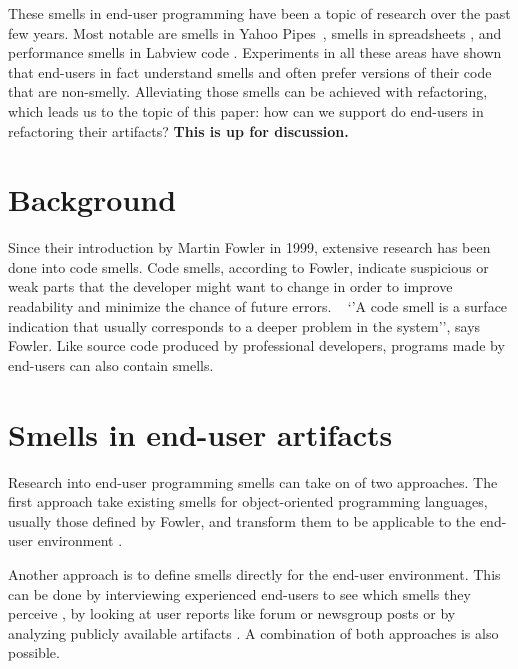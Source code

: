 \documentclass[10pt,conference,compsocconf]{IEEEtran}
\newcommand{\todo}[1]{\textbf{#1}}
\begin{document}
These smells in end-user programming have been a topic of research over the past few years. Most notable are smells in Yahoo Pipes~\cite{Stolee2011}, smells in spreadsheets \cite{Hermans2012-2}, and performance smells in Labview code \cite{chambers2013smell}. Experiments in all these areas have shown that end-users in fact understand smells and often prefer versions of their code that are non-smelly. Alleviating those smells can be achieved with refactoring, which leads us to the topic of this paper: how can we support do end-users in refactoring their artifacts? \todo{This is up for discussion.}

\section{Background}
\label{sec:background}

Since their introduction by Martin Fowler in 1999, extensive research has been done into code smells. Code smells, according to Fowler, indicate suspicious or weak parts that the developer might want to change in order to improve readability and minimize the chance of future errors. ~\cite{Fowl1999} `'A code smell is a surface indication that usually corresponds to a deeper problem in the system'', says Fowler. Like source code produced by professional developers, programs made by end-users can also contain smells.

\section{Smells in end-user artifacts}
\label{sec:smells}
Research into end-user programming smells can take on of two approaches.
The first approach take existing smells for object-oriented programming languages, usually those defined by Fowler, and transform them to be applicable to the end-user environment \cite{Hermans2012,Hermans2012-2}.

Another approach is to define smells directly for the end-user environment.
This can be done by interviewing experienced end-users to see which smells they perceive \cite{chambers2013smell}, by looking at user reports like forum or newsgroup posts \cite{Stolee2011} or by analyzing publicly available artifacts \cite{Stolee2011}.
A combination of both approaches is also possible.
\end{document}
